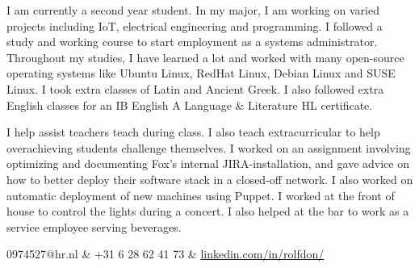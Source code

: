 





\secfont


{
    {
    I am currently a second year student. In my major, I am working on varied projects including IoT, electrical engineering and programming.
    }
    {
    I followed a study and working course to start employment as a systems administrator. Throughout my studies, I have learned a lot and worked with many open-source operating systems like Ubuntu Linux, RedHat Linux, Debian Linux and SUSE Linux.
    }
    {
    I took extra classes of Latin and Ancient Greek. I also followed extra English classes for an IB English A Language \& Literature HL certificate.
    }
}

{
    {
    I help assist teachers teach during class. I also teach extracurricular to help overachieving students challenge themselves.
    }
    {
    I worked on an assignment involving optimizing and documenting Fox's internal JIRA-installation, and gave advice on how to better deploy their software stack in a closed-off network. I also worked on automatic deployment of new machines using Puppet.
    }
    {
    I worked at the front of house to control the lights during a concert. I also helped at the bar to work as a service employee serving beverages.
    }
}

{
}

\vspace{1cm}

{
    0974527@hr.nl & +31 6 28 62 41 73 & \href{https://www.linkedin.com/in/rolfdon/}{linkedin.com/in/rolfdon/} 
}


